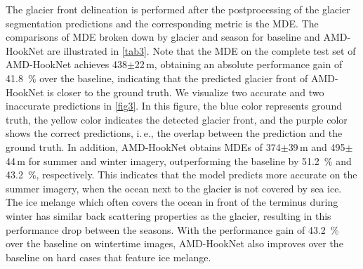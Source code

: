 \documentclass[lettersize,journal,siunitx]{IEEEtran}
\newcommand{\ie}{i.\,e.,\xspace}
\begin{document}
The glacier front delineation is performed after the postprocessing of the glacier segmentation predictions and the corresponding metric is the MDE. The comparisons of MDE broken down by glacier and season for baseline and AMD-HookNet are illustrated in \cref{tab3}. Note that the MDE on the complete test set of AMD-HookNet achieves 438$\pm$22\,m, obtaining an absolute performance gain of \SI{41.8}{\percent} over the baseline, indicating that the predicted glacier front of AMD-HookNet is closer to the ground truth. We visualize two accurate and two inaccurate predictions in \cref{fig3}. In this figure, the blue color represents ground truth, the yellow color indicates the detected glacier front, and the purple color shows the correct predictions, \ie the overlap between the prediction and the ground truth. In addition, AMD-HookNet obtains MDEs of 374$\pm$39\,m and 495$\pm$44\,m for summer and winter imagery, outperforming the baseline by \SI{51.2}{\percent} and \SI{43.2}{\percent}, respectively. This indicates that the model predicts more accurate on the summer imagery, when the ocean next to the glacier is not covered by sea ice. The ice melange which often covers the ocean in front of the terminus during winter has similar back scattering properties as the glacier, resulting in this performance drop between the seasons. With the performance gain of \SI{43.2}{\percent} over the baseline on wintertime images, AMD-HookNet also improves over the baseline on hard cases that feature ice melange.
\end{document}
